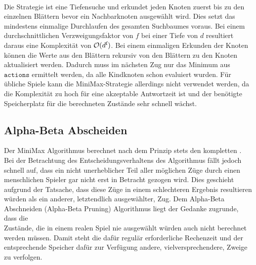 \\ Die Strategie ist eine Tiefensuche und erkundet jeden Knoten zuerst bis zu den einzelnen Blättern bevor ein Nachbarknoten ausgewählt wird. Dies setzt das mindestens einmalige Durchlaufen des gesamten Suchbaumes voraus. Bei einem durchschnittlichen Verzweigungsfaktor von $f$ bei einer Tiefe von $d$ resultiert daraus eine Komplexität von $\mathcal{O}(d\textsuperscript{f})$. Bei einem einmaligen Erkunden der Knoten können die Werte aus den Blättern rekursiv von den Blättern zu den Knoten aktualisiert werden. Dadurch muss im nächsten Zug nur das Minimum aus $\mathtt{actions}$ ermittelt werden, da alle Kindknoten schon evaluiert wurden. Für übliche Spiele kann die MiniMax-Strategie allerdings nicht verwendet werden, da die Komplexität zu hoch für eine akzeptable Antwortzeit ist und der benötigte Speicherplatz für die berechneten Zustände sehr schnell wächst.
\subsection{Alpha-Beta Abscheiden}
\label{ab-pruning}
Der MiniMax Algorithmus berechnet nach dem Prinzip  stets den kompletten \gtree. 
\\Bei der Betrachtung des Entscheidungsverhaltens des Algorithmus fällt jedoch schnell auf, dass ein nicht unerheblicher Teil aller möglichen Züge durch einen menschlichen Spieler gar nicht erst in Betracht gezogen wird. Dies geschieht aufgrund der Tatsache, dass diese Züge in einem schlechteren Ergebnis resultieren würden als ein anderer, letztendlich ausgewählter, Zug.\newline
Dem Alpha-Beta Abschneiden (Alpha-Beta Pruning) Algorithmus liegt der Gedanke zugrunde, dass die \\Zustände, die in einem realen Spiel nie ausgewählt würden auch nicht berechnet werden müssen. Damit steht die dafür regulär erforderliche Rechenzeit und der entsprechende Speicher dafür zur Verfügung andere, vielversprechendere, Zweige zu verfolgen.
